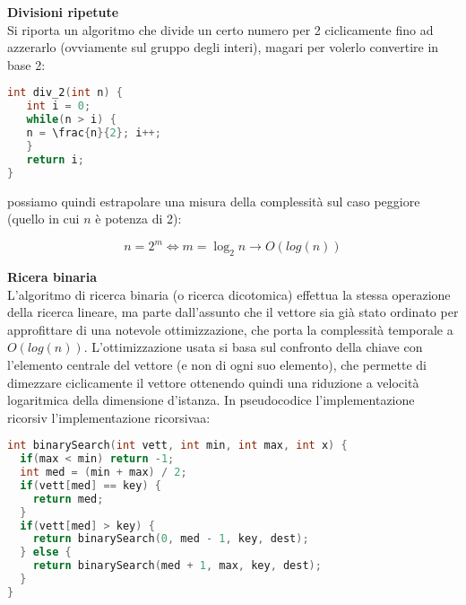 \documentclass[a4paper,12pt]{article}
\begin{document}
\textbf{Divisioni ripetute} \\
Si riporta un algoritmo che divide un certo numero per 2 ciclicamente fino ad azzerarlo (ovviamente sul gruppo degli
interi), magari per volerlo convertire in base 2:
\begin{lstlisting}[language=C++]
int div_2(int n) {
   int i = 0;
   while(n > i) {
   n = \frac{n}{2}; i++;
   }
   return i;
}
\end{lstlisting}

possiamo quindi estrapolare una misura della complessità sul caso peggiore (quello in cui $n$ è potenza di 2):

$$ n = 2^m \Leftrightarrow m = \log_2{n} \rightarrow O(log(n)) $$

\textbf{Ricera binaria} \\
L'algoritmo di ricerca binaria (o ricerca dicotomica) effettua la stessa operazione della ricerca lineare, ma
parte dall'assunto che il vettore sia già stato ordinato per approfittare di una notevole ottimizzazione, che porta la complessità
temporale a $O(log(n))$. L'ottimizzazione usata si basa sul confronto della chiave con l'elemento centrale del vettore
(e non di ogni suo elemento), che permette di dimezzare ciclicamente il vettore ottenendo quindi una riduzione
a velocità logaritmica della dimensione d'istanza. In pseudocodice l'implementazione ricorsiv l'implementazione ricorsivaa:

\begin{lstlisting}[language=C++]
int binarySearch(int vett, int min, int max, int x) {
  if(max < min) return -1;
  int med = (min + max) / 2;
  if(vett[med] == key) {
    return med;
  }
  if(vett[med] > key) {
    return binarySearch(0, med - 1, key, dest);
  } else {
    return binarySearch(med + 1, max, key, dest);
  }
}
\end{lstlisting}
\end{document}

